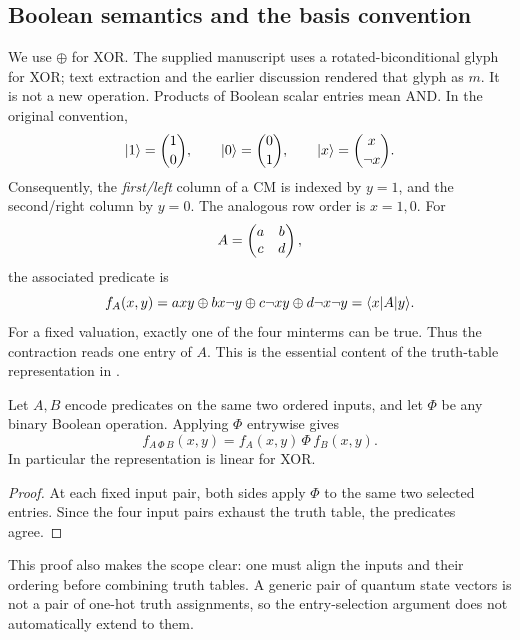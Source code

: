 \subsection{Boolean semantics and the basis convention}
We use $\oplus$ for XOR. The supplied manuscript uses a rotated-biconditional glyph for XOR; text extraction and the earlier discussion rendered that glyph as $m$. It is not a new operation. Products of Boolean scalar entries mean AND. In the original convention,
\begin{equation}
 \lvert 1\rangle=\binom10,\qquad \lvert 0\rangle=\binom01,\qquad
 \lvert x\rangle=\binom{x}{\neg x}.
\end{equation}
Consequently, the \emph{first/left} column of a CM is indexed by $y=1$, and the second/right column by $y=0$. The analogous row order is $x=1,0$. For
\begin{equation}
 A=\begin{pmatrix}a&b\\c&d\end{pmatrix},
\end{equation}
the associated predicate is
\begin{equation}\label{eq:predicate}
 f_A(x,y)=a xy\oplus b x\neg y\oplus c\neg x y\oplus d\neg x\neg y
          =\langle x\rvert A\lvert y\rangle.
\end{equation}
For a fixed valuation, exactly one of the four minterms can be true. Thus the contraction reads one entry of $A$. This is the essential content of the truth-table representation in \cite[Sections 2.2--3]{droncheff}.

\begin{proposition}\label{prop:pointwise}
Let $A,B$ encode predicates on the same two ordered inputs, and let $\Phi$ be any binary Boolean operation. Applying $\Phi$ entrywise gives
\begin{equation}
 f_{A\,\Phi\,B}(x,y)=f_A(x,y)\,\Phi\,f_B(x,y).
\end{equation}
In particular the representation is linear for XOR.
\end{proposition}
\begin{proof}
At each fixed input pair, both sides apply $\Phi$ to the same two selected entries. Since the four input pairs exhaust the truth table, the predicates agree.
\end{proof}
This proof also makes the scope clear: one must align the inputs and their ordering before combining truth tables. A generic pair of quantum state vectors is not a pair of one-hot truth assignments, so the entry-selection argument does not automatically extend to them.

